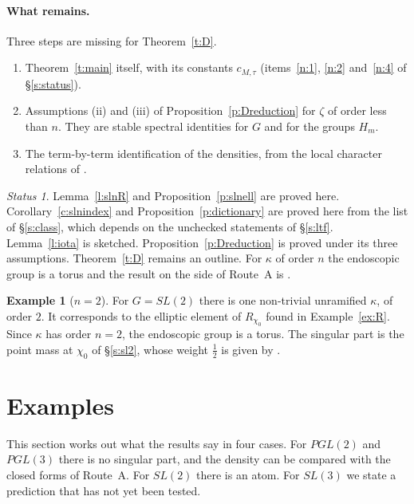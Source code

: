 \documentclass[12pt,letterpaper]{article}
\numberwithin{equation}{section}
\theoremstyle{plain}
\theoremstyle{definition}
\newtheorem{example}[theorem]{Example}
\theoremstyle{remark}
\newtheorem{status}[theorem]{Status}
\begin{document}
\paragraph{What remains.} Three steps are missing for Theorem~\ref{t:D}.
\begin{enumerate}[label=(\roman*)]
\item Theorem~\ref{t:main} itself, with its constants $c_{M,\tau}$ (items~\ref{n:1}, \ref{n:2} and~\ref{n:4} of \S\ref{s:status}).
\item Assumptions (ii) and (iii) of Proposition~\ref{p:Dreduction} for $\zeta$ of order less than $n$. They are stable spectral identities for $G$ and for the groups $H_m$.
\item The term-by-term identification of the densities, from the local character relations of \cite{Ar96}.
\end{enumerate}

\begin{status}
Lemma~\ref{l:slnR} and Proposition~\ref{p:slnell} are proved here. Corollary~\ref{c:slnindex} and Proposition~\ref{p:dictionary} are proved here from the list of \S\ref{s:class}, which depends on the unchecked statements of \S\ref{s:ltf}. Lemma~\ref{l:iota} is sketched. Proposition~\ref{p:Dreduction} is proved under its three assumptions. Theorem~\ref{t:D} remains an outline. For $\kappa$ of order $n$ the endoscopic group is a torus and the result on the side of Route~A is \cite[Prop.~5.1]{JC26}.
\end{status}

\begin{example}[$n=2$]\label{ex:endo}
For $G=SL(2)$ there is one non-trivial unramified $\kappa$, of order $2$. It corresponds to the elliptic element of $R_{\chi_0}$ found in Example~\ref{ex:R}. Since $\kappa$ has order $n=2$, the endoscopic group is a torus. The singular part is the point mass at $\chi_0$ of \S\ref{s:sl2}, whose weight $\frac12$ is given by \cite[Prop.~6.4]{JC26}.
\end{example}

\section{Examples}\label{s:ex}

This section works out what the results say in four cases. For $PGL(2)$ and $PGL(3)$ there is no singular part, and the density can be compared with the closed forms of Route~A. For $SL(2)$ there is an atom. For $SL(3)$ we state a prediction that has not yet been tested.
\end{document}
